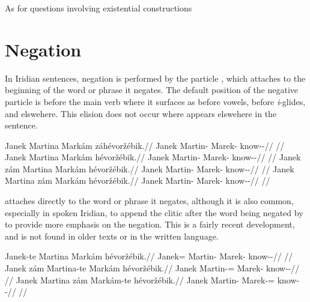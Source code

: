 \ex{}
\xe


As for questions involving existential constructions


\section{Negation}\label{sec:negation}

In Iridian sentences, negation is performed by the particle , which
attaches to the beginning of the word or phrase  it negates. The default
position of the negative particle is before the main verb where it surfaces as
 before vowels,  before \emph{i}-glides, and 
elswehere. This elision does not occur where  appears elswehere in
the sentence.

\pex
\a
\begingl
    \gla Janek Martina Markám {zá}hévoržébik.//
    \glb Janek Martin-\Acc{} Marek-\Agt{} \Neg{}know-\Ben{}-\Pf{}//
    \glft {}//
\endgl
\a
\begingl
     Janek Martina Markám hévoržébik.//
    \glb \Neg{} Janek Martin-\Acc{} Marek-\Agt{} know-\Ben{}-\Pf{}//
    \glft {}//
\endgl
\a
\begingl
    \gla Janek {zám} Martina Markám hévoržébik.//
    \glb Janek \Neg{} Martin-\Acc{} Marek-\Agt{} know-\Ben{}-\Pf{}//
    \glft {}//
\endgl
\a
\begingl
    \gla Janek Martina {zám} Markám hévoržébik.//
    \glb Janek Martin-\Acc{} \Neg{} Marek-\Agt{} know-\Ben{}-\Pf{}//
    \glft {}//
\endgl
\xe

 attaches directly to the word or phrase it negates, although it is
also common, especially in spoken Iridian, to append the clitic  after
the word being negated by  to provide more emphasis on the negation.
This is a fairly recent development, and is not found in older texts or in the
written language.

\pex
\a
\begingl
     Janek{-te} Martina Markám hévoržébik.//
    \glb \Neg{} Janek=\Foc{} Martin-\Acc{} Marek-\Agt{} know-\Ben{}-\Pf{}//
    \glft {}//
\endgl
\a
\begingl
    \gla Janek {zám} Martina{-te} Markám hévoržébik.//
    \glb Janek \Neg{} Martin-\Acc{}=\Foc{} Marek-\Agt{} know-\Ben{}-\Pf{}//
    \glft {}//
\endgl
\a
\begingl
    \gla Janek Martina {zám} Markám{-te} hévoržébik.//
    \glb Janek Martin-\Acc{} \Neg{} Marek-\Agt{}=\Foc{} know-\Ben{}-\Pf{}//
    \glft {}//
\endgl
\xe

